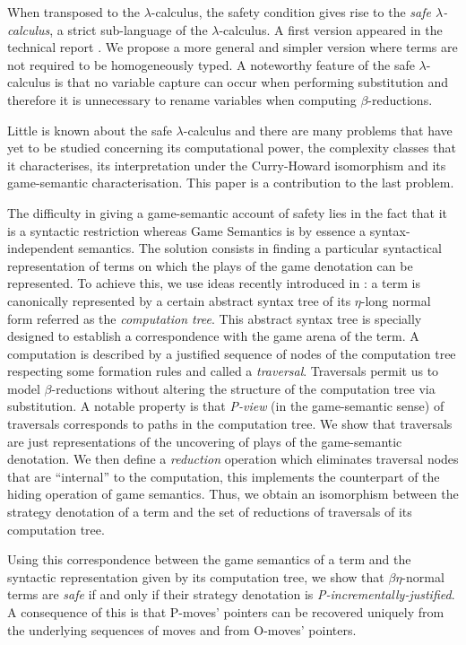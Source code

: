 \documentclass{llncs}
\begin{document}
When transposed to the $\lambda$-calculus, the safety condition
gives rise to the \emph{safe $\lambda$-calculus}, a strict
sub-language of the $\lambda$-calculus. A first version appeared in the technical report \cite{safety-mirlong2004}. We propose a more general and simpler version where terms are not required to be homogeneously typed. A noteworthy feature of the safe $\lambda$-calculus is that no variable capture can occur when performing substitution and therefore it is unnecessary to rename variables when computing $\beta$-reductions.

Little is known about the safe $\lambda$-calculus and there are many problems that have yet to be studied concerning its computational power, the complexity classes that it characterises, its interpretation under the Curry-Howard isomorphism and its game-semantic characterisation. This paper is a contribution to the last problem.


The difficulty in giving a game-semantic account of safety lies in the fact that it is a syntactic restriction whereas Game Semantics is by essence a syntax-independent semantics. The solution consists in finding a particular syntactical representation of terms on which the plays of the game denotation can be represented.
To achieve this, we use ideas recently introduced in \cite{OngLics2006}: a term is canonically represented by a certain abstract syntax tree of its $\eta$-long normal form referred as the \emph{computation tree}. This abstract syntax tree is specially designed to establish a correspondence with the game arena of the term. A computation is described by a justified sequence of nodes of the computation tree respecting some formation rules and called a \emph{traversal}. Traversals permit us to model $\beta$-reductions without altering the structure of the computation tree via substitution. A notable property is that \emph{P-view} (in the game-semantic sense) of traversals corresponds to paths in the computation tree.
We show that traversals are just representations of the uncovering of plays of the game-semantic denotation. We then define a \emph{reduction} operation which eliminates traversal nodes that are ``internal'' to the computation, this implements the counterpart of the hiding operation of game semantics. Thus, we obtain an isomorphism between the strategy denotation of a term and the set of reductions of traversals of its computation tree.

Using this correspondence between the game semantics of a term and the syntactic representation given by its computation tree, we show that $\beta\eta$-normal terms are \emph{safe} if and only if their strategy denotation is \emph{P-incrementally-justified}. A consequence of this is that P-moves' pointers can be recovered uniquely from the underlying sequences of moves and from O-moves' pointers.
\end{document}
